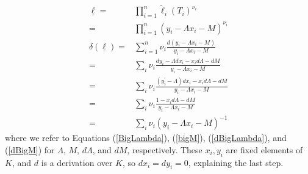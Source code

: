 \documentclass[11pt,letterpaper]{article}
\theoremstyle{definition}
\newcommand{\6}{\mathbf}
\newcommand{\7}{\mathcal}
\begin{document}
\begin{align}
\underline{\ell} =& \prod_{i=1}^{n} \widetilde{\ell}_i(T_i)^{\nu_i} \\
=& \prod_{i=1}^{n} (y_i - \Lambda x_i - M)^{\nu_i}\\
\delta(\underline{\ell}) =& \sum_{i=1}^{n} \nu_i \frac{d\left(y_i - \Lambda x_i - M\right)}{y_i - \Lambda x_i - M} \\
=& \sum_i \nu_i \frac{dy_i - \Lambda dx_i - x_i d\Lambda - dM}{y_i - \Lambda x_i - M}\\
=& \sum_i \nu_i \frac{(y_i^\prime - \Lambda)dx_i - x_i d\Lambda - dM}{y_i - \Lambda x_i - M} \\
=& \sum_i \nu_i \frac{1 - x_i d\Lambda - dM}{y_i - \Lambda x_i - M} \\
=& \sum_i \nu_i (y_i - \Lambda x_i - M)^{-1}  \label{delta_ell}
\end{align} where we refer to Equations (\ref{BigLambda}), (\ref{bigM}), (\ref{dBigLambda}), and (\ref{dBigM}) for $\Lambda$, $M$, $d\Lambda$, and $dM$, respectively.
These $x_i, y_i$ are fixed elements of $K$, and $d$ is a derivation over $K$, so $dx_i = dy_i = 0$, explaining the last step. 






\end{document}
